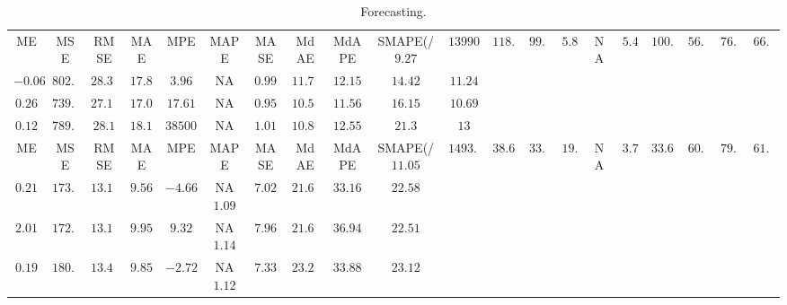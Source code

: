 \begin{table}
{\begin{tabular}{|c|c|c|c|c|c|c|c|c|c|c|}
ME &MSE &RMSE &MAE &MPE &MAPE &MASE &MdAE &MdAPE & SMAPE(/%
$9.27$ & $13990.68$ & $118.28$ & $99.08$ & $5.86$ & N\/A &$5.49$ & $100.03$ & $56.13$ & $76.08$ & $66.78$ \\
\bf{$-0.06$} & $802.93$ & $28.34$ & $17.85$ & \bf{$3.96$} & N\/A &$0.99$ & $11.72$ & $12.15$ & \bf{$14.42$} & $11.24$ \\
$0.26$ & \bf{$739.31$} & \bf{$27.19$} & \bf{$17.06$} & $17.61$ & N\/A &\bf{$0.95$} & \bf{$10.52$} & \bf{$11.56$} & $16.15$ & \bf{$10.69$} \\
$0.12$ & $789.6$ & $28.1$ & $18.18$ & $38500.8$ & N\/A &$1.01$ & $10.88$ & $12.55$ & $21.3$ & $13$ \\

ME &MSE &RMSE &MAE &MPE &MAPE &MASE &MdAE &MdAPE & SMAPE(/%
$11.05$ & $1493.67$ & $38.65$ & $33.09$ & $19.74$ & N\/A &$3.78$ & $33.65$ & $60.83$ & $79.85$ & $61.23$ \\
$0.21$ & $173.88$ & $13.19$ & \bf{$9.56$} & \bf{$-4.66$} & N\/A\bf{$1.09$} & \bf{$7.02$} & $21.66$ & \bf{$33.16$} & $22.58$ \\
$2.01$ & \bf{$172.23$} & \bf{$13.12$} & $9.95$ & $9.32$ & N\/A$1.14$ & $7.96$ & \bf{$21.61$} & $36.94$ & \bf{$22.51$} \\
\bf{$0.19$} & $180.75$ & $13.44$ & $9.85$ & $-2.72$ & N\/A$1.12$ & $7.33$ & $23.25$ & $33.88$ & $23.12$ \\
\hline
\end{tabular}
}
\caption{Forecasting.}
\label{tab:forecasting}
\end{table}
